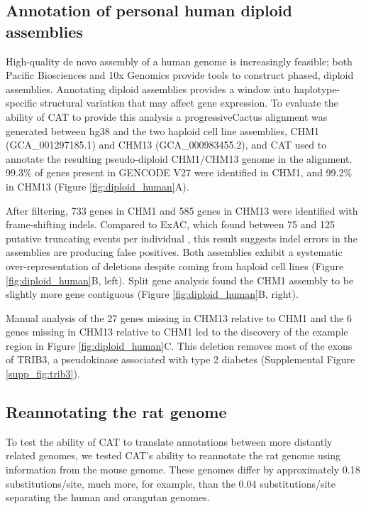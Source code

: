 \documentclass[fleqn,10pt]{wlscirep}
\begin{document}
\subsection*{Annotation of personal human diploid assemblies}

High-quality de novo assembly of a human genome is increasingly feasible; both Pacific Biosciences \cite{chin2016phased,huddleston2016discovery,korlach2017novo} and 10x Genomics \cite{Weisenfeld070425} provide tools to construct phased, diploid assemblies. Annotating diploid assemblies provides a window into haplotype-specific structural variation that may affect gene expression. To evaluate the ability of CAT to provide this analysis a progressiveCactus alignment was generated between hg38 and the two haploid cell line assemblies, CHM1 (GCA\_001297185.1) and CHM13 (GCA\_000983455.2), and CAT used to annotate the resulting pseudo-diploid CHM1/CHM13 genome in the alignment. 99.3\% of genes present in GENCODE V27 were identified in CHM1, and 99.2\% in CHM13 (Figure \ref{fig:diploid_human}A). 
    
After filtering, 733 genes in CHM1 and 585 genes in CHM13 were identified with frame-shifting indels. Compared to ExAC, which found between 75 and 125 putative truncating events per individual \cite{karczewski2016exac}, this result suggests indel errors in the assemblies are producing false positives. Both assemblies exhibit a systematic over-representation of deletions despite coming from haploid cell lines (Figure \ref{fig:diploid_human}B, left). Split gene analysis found the CHM1 assembly to be slightly more gene contiguous (Figure \ref{fig:diploid_human}B, right).

Manual analysis of the 27 genes missing in CHM13 relative to CHM1 and the 6 genes missing in CHM13 relative to CHM1 led to the discovery of the example region in Figure \ref{fig:diploid_human}C. This deletion removes most of the exons of TRIB3, a pseudokinase associated with type 2 diabetes \cite{shi2009association} (Supplemental Figure \ref{supp_fig:trib3}).

\subsection*{Reannotating the rat genome}

To test the ability of CAT to translate annotations between more distantly related genomes, we tested CAT's ability to reannotate the rat genome using information from the mouse genome. These genomes differ by approximately 0.18 substitutions/site, much more, for example, than the 0.04 substitutions/site separating the human and orangutan genomes\cite{karolchik2003ucsc}.
\end{document}
